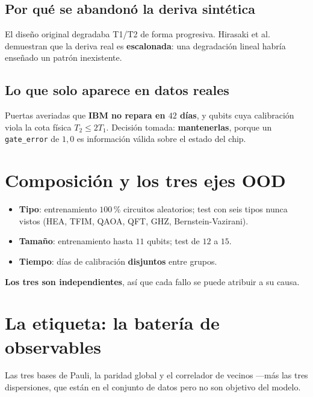 \subsection{Por qué se abandonó la deriva sintética}
El diseño original degradaba T1/T2 de forma progresiva. Hirasaki et al. demuestran que la
deriva real es \textbf{escalonada}: una degradación lineal habría enseñado un patrón inexistente.

\subsection{Lo que solo aparece en datos reales}
Puertas averiadas que \textbf{IBM no repara en $42$ días}, y qubits cuya calibración viola la
cota física $T_2 \leq 2T_1$. Decisión tomada: \textbf{mantenerlas}, porque un
\texttt{gate\_error} de $1{,}0$ es información válida sobre el estado del chip.

\section{Composición y los tres ejes OOD}
\label{sec:ejes}
\begin{itemize}
    \item \textbf{Tipo}: entrenamiento $100$\,\% circuitos aleatorios; test con seis tipos nunca
          vistos (HEA, TFIM, QAOA, QFT, GHZ, Bernstein-Vazirani).
    \item \textbf{Tamaño}: entrenamiento hasta $11$ qubits; test de $12$ a $15$.
    \item \textbf{Tiempo}: días de calibración \textbf{disjuntos} entre grupos.
\end{itemize}
\textbf{Los tres son independientes}, así que cada fallo se puede atribuir a su causa.

\section{La etiqueta: la batería de observables}
\label{sec:observables}
%
Las tres bases de Pauli, la paridad global y el correlador de vecinos —más las tres
dispersiones, que están en el conjunto de datos pero no son objetivo del modelo.

